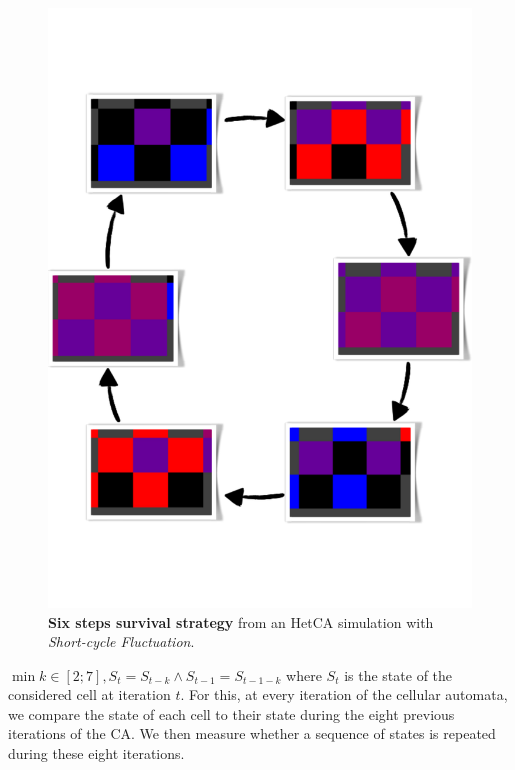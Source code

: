 \documentclass[letterpaper]{article}
\begin{document}
\begin{figure}[h]
\centering
\includegraphics[width=0.75\columnwidth, angle =-90]{cyclesReal}
\caption{\textbf{Six steps survival strategy} from an HetCA simulation with \emph{Short-cycle Fluctuation}. }
  \label{fourstepsreal}
\end{figure}

$\min k \in [2;7], S_t=S_{t-k} \wedge S_{t-1}=S_{t-1-k}$ where $S_t$  is the state of the considered cell at iteration $t$.
For this, at every iteration of the cellular automata, we compare the state of each cell to their state during the eight previous iterations of the CA. We then measure whether a sequence of states is repeated during these eight iterations.
\end{document}
